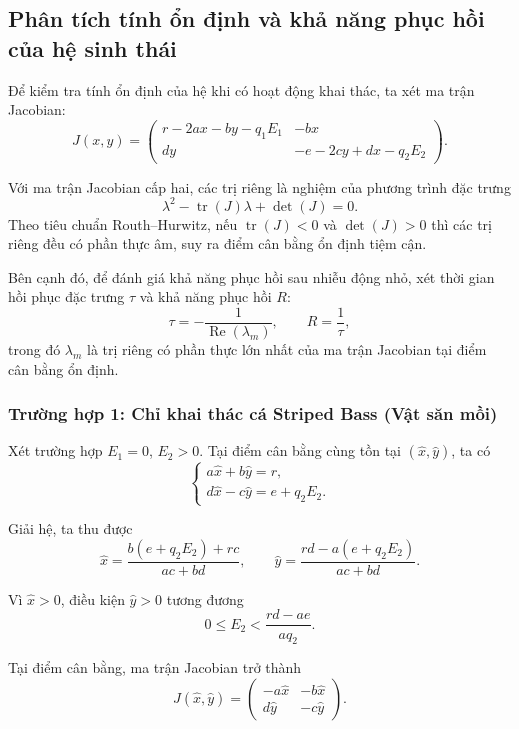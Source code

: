 \subsection{Phân tích tính ổn định và khả năng phục hồi của hệ sinh thái}

Để kiểm tra tính ổn định của hệ khi có hoạt động khai thác,
ta xét ma trận Jacobian:
\begin{equation}
    J(x,y)=
    \begin{pmatrix}
        r-2ax-by-q_1E_1 & -bx\\
        dy & -e-2cy+dx-q_2E_2
    \end{pmatrix}.
\end{equation}


Với ma trận Jacobian cấp hai, các trị riêng
là nghiệm của phương trình đặc trưng
\[
    \lambda^2-\operatorname{tr}(J)\lambda
    +\det(J)=0.
\]
Theo tiêu chuẩn Routh--Hurwitz, nếu
$\operatorname{tr}(J)<0$ và $\det(J)>0$
thì các trị riêng đều có phần thực âm,
suy ra điểm cân bằng ổn định tiệm cận.

Bên cạnh đó, để đánh giá khả năng
phục hồi sau nhiễu động nhỏ, xét thời gian hồi phục
đặc trưng $\tau$ và khả năng phục hồi $R$:
\begin{equation}
    \tau=-\frac{1}{\operatorname{Re}(\lambda_m)},
    \qquad R=\frac{1}{\tau},
\end{equation}
trong đó $\lambda_m$ là trị riêng có phần thực lớn nhất
của ma trận Jacobian tại điểm cân bằng ổn định.

\subsubsection{Trường hợp 1: Chỉ khai thác cá Striped Bass (Vật săn mồi)}

Xét trường hợp $E_1=0$, $E_2>0$. Tại điểm cân bằng
cùng tồn tại $(\hat{x},\hat{y})$, ta có
\[
    \begin{cases}
        a\hat{x}+b\hat{y}=r,\\
        d\hat{x}-c\hat{y}=e+q_2E_2.
    \end{cases}
\]

Giải hệ, ta thu được
\[
    \hat{x}=\frac{b(e+q_2E_2)+rc}{ac+bd},
    \qquad
    \hat{y}=\frac{rd-a(e+q_2E_2)}{ac+bd}.
\]

Vì $\hat{x}>0$, điều kiện $\hat{y}>0$ tương đương
\begin{equation}
    0\leq E_2<\frac{rd-ae}{aq_2}.
\end{equation}

Tại điểm cân bằng, ma trận Jacobian trở thành
\[
    J(\hat{x},\hat{y})=
    \begin{pmatrix}
        -a\hat{x} & -b\hat{x}\\
        d\hat{y} & -c\hat{y}
    \end{pmatrix}.
\]

